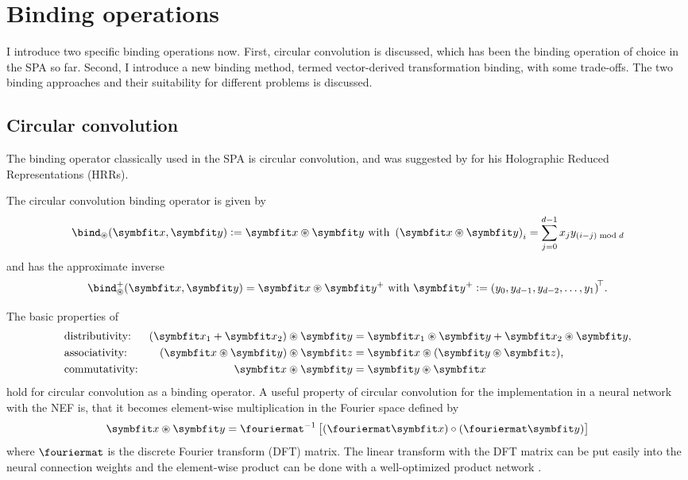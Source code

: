 \section{Binding operations}
I introduce two specific binding operations now.
First, circular convolution is discussed, which has been the binding operation of choice in the SPA so far.
Second, I introduce a new binding method, termed vector-derived transformation binding, with some trade-offs.
The two binding approaches and their suitability for different problems is discussed.

\subsection{Circular convolution}
The binding operator classically used in the SPA is circular convolution, and was suggested by \textcite{plate1995,plate2003} for his Holographic Reduced Representations (HRRs).
\begin{defn}
    The circular convolution binding operator is given by
    \begin{equation}
        \bind_{\circledast}(\vc x, \vc y) := \vc x \circledast \vc y\ \text{with}\ \del{\vc x \circledast \vc y}_i = \sum_{j=0}^{d - 1} x_j y_{(i - j) \bmod d}
    \end{equation}
    and has the approximate inverse \parencite{plate2003}
    \begin{equation}
        \bind^+_{\circledast}(\vc x, \vc y) = \vc x \circledast \vc y^+\ \text{with}\ \vc y^+ := {\del{y_0, y_{d-1}, y_{d-2}, \dotsc, y_1}\!}\Tr \text{.}
    \end{equation}
\end{defn}

The basic properties of
\begin{align}
    &\text{distributivity:} &(\vc x_1 + \vc x_2) \circledast \vc y &= \vc x_1 \circledast \vc y + \vc x_2 \circledast \vc y \text{,}\\
    &\text{associativity:} &(\vc x \circledast \vc y) \circledast \vc z &= \vc x \circledast (\vc y \circledast \vc z) \text{,} \\
    &\text{commutativity:} &\vc x \circledast \vc y &= \vc y \circledast \vc x
\end{align}
hold for circular convolution as a binding operator.
A useful property of circular convolution for the implementation in a neural network with the NEF is, that it becomes element-wise multiplication in the Fourier space defined by
\begin{equation}
    \vc x \circledast \vc y = \fouriermat^{-1}\sbr{(\fouriermat \vc x) \circ (\fouriermat \vc y)}
\end{equation}
where $\fouriermat$ is the discrete Fourier transform (DFT) matrix.
The linear transform with the DFT matrix can be put easily into the neural connection weights and the element-wise product can be done with a well-optimized product network \parencite{gosmann2015-1}.

